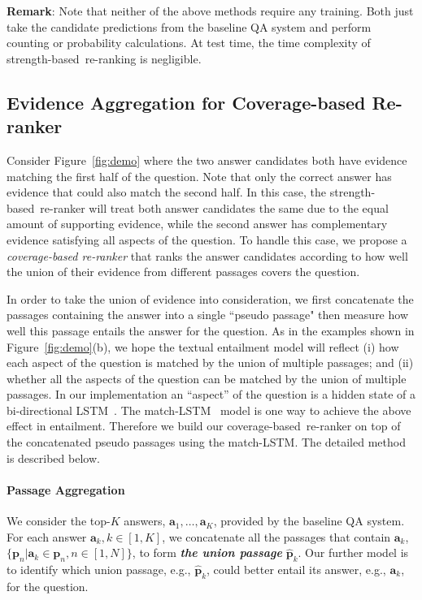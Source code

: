 \documentclass{article} \usepackage{iclr2018_conference,times}
\def \coherence {strength-based}
\def \union {coverage-based}
\begin{document}
\noindent\textbf{Remark}: Note that neither of the above methods require any training. Both just take the candidate predictions from the baseline QA system and  perform counting or probability calculations. At test time, the time complexity of \coherence\ re-ranking is negligible. 

\subsection{Evidence Aggregation for Coverage-based Re-ranker}
\label{sec:method_union}
Consider Figure~\ref{fig:demo} where the two answer candidates both have evidence matching the first half of the question. Note that only the correct answer has evidence that could also match the second half. In this case, the \coherence\ re-ranker will treat both answer candidates the same due to the equal amount of supporting evidence, while the second answer has complementary evidence satisfying all aspects of the question. To handle this case, we propose a \emph{coverage-based re-ranker} that ranks the answer candidates according to how well the union of their evidence from different passages covers the question.

In order to take the union of evidence into consideration, we first concatenate the passages containing the answer into a single ``pseudo passage" then  measure how well this passage entails the answer for the question. As in the examples shown in Figure~\ref{fig:demo}(b), we hope the textual entailment model will reflect (i) how each aspect of the question is matched by the union of multiple passages; and (ii) whether all the aspects of the question can be matched by the union of multiple passages. In our implementation an ``aspect'' of the question is a hidden state of a bi-directional LSTM~\citep{hochreiter1997long}. The match-LSTM~\citep{wang2015learning:NAACL2016} model is one way to achieve the above effect in entailment. Therefore we build our \union\ re-ranker on top of the concatenated pseudo passages using the match-LSTM. The detailed method is described below.

\paragraph{Passage Aggregation} We consider the top-$K$ answers, $\mathbf{a}_1, \ldots, \mathbf{a}_K$, provided by the baseline QA system. For each answer $\mathbf{a}_k, k\in [1, K]$, we concatenate all the passages that contain $\mathbf{a}_k$, $\{\mathbf{p}_n| \mathbf{a}_k \in \mathbf{p}_n,n \in [1,N]\}$,  to form \textbf{\emph{the union passage}} $\mathbf{\hat{p}}_k$. 
Our further model is to identify which union passage, e.g., $\mathbf{\hat{p}}_k$, could better entail its answer, e.g., $\mathbf{a}_k$, for the question. 
\end{document}
